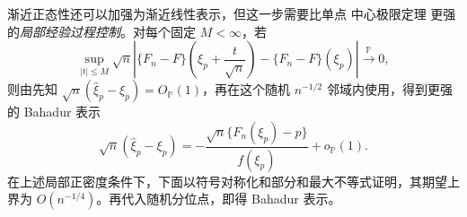\begin{proposition}
渐近正态性还可以加强为渐近线性表示，但这一步需要比单点 中心极限定理 更强的\emph{局部经验过程控制}。对每个固定 $M<\infty$，若
\begin{equation}\label{eq:math-stat-local-empirical-equicontinuity}
 \sup_{|t|\le M}
 \sqrt n\left|
 \{F_n-F\}\!\left(\xi_p+\frac{t}{\sqrt n}\right)
 -\{F_n-F\}(\xi_p)
 \right|
 \xrightarrow{\mathbb P}0,
\end{equation}
则由先知
$\sqrt n(\widehat\xi_p-\xi_p)=O_{\mathbb P}(1)$，再在这个随机 $n^{-1/2}$ 邻域内使用，得到更强的 Bahadur 表示
\begin{equation}\label{eq:math-stat-quantile-bahadur}
 \sqrt n(\widehat\xi_p-\xi_p)
 =-\frac{\sqrt n\{F_n(\xi_p)-p\}}{f(\xi_p)}
 +o_{\mathbb P}(1).
\end{equation}
在上述局部正密度条件下，下面以符号对称化和部分和最大不等式证明，其期望上界为 $O(n^{-1/4})$。再代入随机分位点，即得 Bahadur 表示。

\end{proposition}

